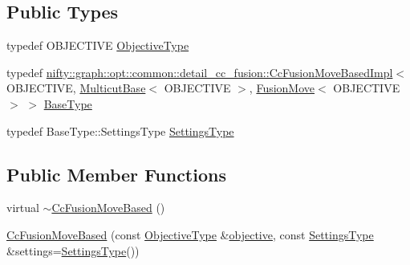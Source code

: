 \subsection*{Public Types}
\begin{DoxyCompactItemize}
\item 
typedef O\+B\+J\+E\+C\+T\+I\+VE \hyperlink{classnifty_1_1graph_1_1opt_1_1multicut_1_1CcFusionMoveBased_a36f47f4066a3a686514ed6a505608345}{Objective\+Type}
\item 
typedef \hyperlink{classnifty_1_1graph_1_1opt_1_1common_1_1detail__cc__fusion_1_1CcFusionMoveBasedImpl}{nifty\+::graph\+::opt\+::common\+::detail\+\_\+cc\+\_\+fusion\+::\+Cc\+Fusion\+Move\+Based\+Impl}$<$ O\+B\+J\+E\+C\+T\+I\+VE, \hyperlink{classnifty_1_1graph_1_1opt_1_1multicut_1_1MulticutBase}{Multicut\+Base}$<$ O\+B\+J\+E\+C\+T\+I\+VE $>$, \hyperlink{classnifty_1_1graph_1_1opt_1_1multicut_1_1FusionMove}{Fusion\+Move}$<$ O\+B\+J\+E\+C\+T\+I\+VE $>$ $>$ \hyperlink{classnifty_1_1graph_1_1opt_1_1multicut_1_1CcFusionMoveBased_abcaa1195c99c6748f91ec07288e9bdc2}{Base\+Type}
\item 
typedef Base\+Type\+::\+Settings\+Type \hyperlink{classnifty_1_1graph_1_1opt_1_1multicut_1_1CcFusionMoveBased_a0e5269b8e826a05c6999a3f82ca4fc55}{Settings\+Type}
\end{DoxyCompactItemize}
\subsection*{Public Member Functions}
\begin{DoxyCompactItemize}
\item 
virtual \hyperlink{classnifty_1_1graph_1_1opt_1_1multicut_1_1CcFusionMoveBased_a7ee02c5606c4ffbb0fe94534dac58101}{$\sim$\+Cc\+Fusion\+Move\+Based} ()
\item 
\hyperlink{classnifty_1_1graph_1_1opt_1_1multicut_1_1CcFusionMoveBased_aee1e025e2a17e534a1fda9e8c3848f71}{Cc\+Fusion\+Move\+Based} (const \hyperlink{classnifty_1_1graph_1_1opt_1_1multicut_1_1CcFusionMoveBased_a36f47f4066a3a686514ed6a505608345}{Objective\+Type} \&\hyperlink{classnifty_1_1graph_1_1opt_1_1common_1_1detail__cc__fusion_1_1CcFusionMoveBasedImpl_af9355be55bd8497b059a2e5b1842a20b}{objective}, const \hyperlink{classnifty_1_1graph_1_1opt_1_1multicut_1_1CcFusionMoveBased_a0e5269b8e826a05c6999a3f82ca4fc55}{Settings\+Type} \&settings=\hyperlink{classnifty_1_1graph_1_1opt_1_1multicut_1_1CcFusionMoveBased_a0e5269b8e826a05c6999a3f82ca4fc55}{Settings\+Type}())
\end{DoxyCompactItemize}


